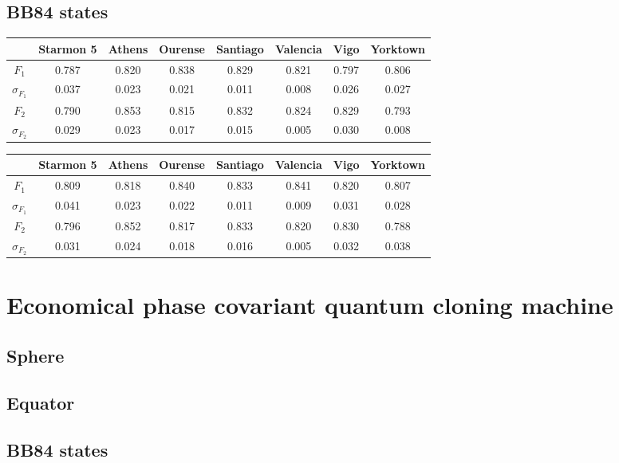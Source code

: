 \subsection{BB84 states}


\begin{table}[H]
    \centering
    \begin{tabular}{|c|c|c|c|c|c|c|c|}
    \hline
    \textbf{} & \textbf{Starmon 5} & \textbf{Athens} & \textbf{Ourense} & \textbf{Santiago} & \textbf{Valencia} & \textbf{Vigo} & \textbf{Yorktown} \\ \hline
    $F_1$              & 0.787 & 0.820 & 0.838 & 0.829 & 0.821 & 0.797 & 0.806 \\ \hline
    $\sigma_{F_1}$     & 0.037 & 0.023 & 0.021 & 0.011 & 0.008 & 0.026 & 0.027 \\ \hline
    $F_2$              & 0.790 & 0.853 & 0.815 & 0.832 & 0.824 & 0.829 & 0.793 \\ \hline
    $\sigma_{F_2}$     & 0.029 & 0.023 & 0.017 & 0.015 & 0.005 & 0.030 & 0.008 \\ \hline
    \end{tabular}
\end{table}

\begin{table}[H]
    \centering
    \begin{tabular}{|c|c|c|c|c|c|c|c|}
    \hline
    \textbf{} & \textbf{Starmon 5} & \textbf{Athens} & \textbf{Ourense} & \textbf{Santiago} & \textbf{Valencia} & \textbf{Vigo} & \textbf{Yorktown} \\ \hline
    $F_1$              & 0.809 & 0.818 & 0.840 & 0.833 & 0.841 & 0.820 & 0.807 \\ \hline
    $\sigma_{F_1}$     & 0.041 & 0.023 & 0.022 & 0.011 & 0.009 & 0.031 & 0.028 \\ \hline
    $F_2$              & 0.796 & 0.852 & 0.817 & 0.833 & 0.820 & 0.830 & 0.788 \\ \hline
    $\sigma_{F_2}$     & 0.031 & 0.024 & 0.018 & 0.016 & 0.005 & 0.032 & 0.038 \\ \hline
    \end{tabular}
\end{table}
\section{Economical phase covariant quantum cloning machine}
\subsection{Sphere}
\subsection{Equator}
\subsection{BB84 states}